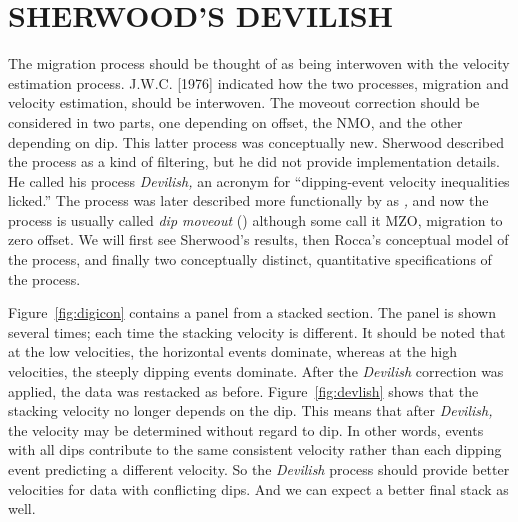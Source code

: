 \section{SHERWOOD'S DEVILISH}
The migration process should be thought of as being interwoven with the
velocity estimation process.
J.W.C.  [1976] indicated how the two processes,
migration and velocity estimation, should be interwoven.
The moveout correction should be considered in two parts,
one depending on offset, the NMO, and the other depending on dip.
This latter process was conceptually new.
Sherwood described the process as a kind of filtering,
but he did not provide implementation details.
He called his process
{\em  Devilish,}
an acronym for ``dipping-event velocity inequalities licked.''
The process was later described more functionally by  as
{\em 
{},
}
and now
the process is usually called
{\em 
dip moveout
}
()
although some call it MZO, migration to zero offset.
We will first see Sherwood's results,
then Rocca's conceptual model of the  process,
and finally two conceptually distinct, quantitative specifications
of the process.
\par
Figure~\ref{fig:digicon} contains a panel from a stacked section.
\newslide
The panel is shown several times;
each time the stacking velocity is different.  
It should be noted that at the low velocities,
the horizontal events dominate,
whereas at the high velocities,
the steeply dipping events dominate.
After the
{\em  Devilish}
correction was applied, the data was restacked as before.
Figure~\ref{fig:devlish} shows that the stacking velocity
no longer depends on the dip.
\newslide
This means that after 
{\em  Devilish,}
the velocity may be determined without regard to dip.
In other words,
events with all dips contribute to the same consistent velocity
rather than each dipping event predicting a different velocity.
So the 
{\em  Devilish} 
process should provide better velocities for data with conflicting dips.
And we can expect a better final stack as well.


